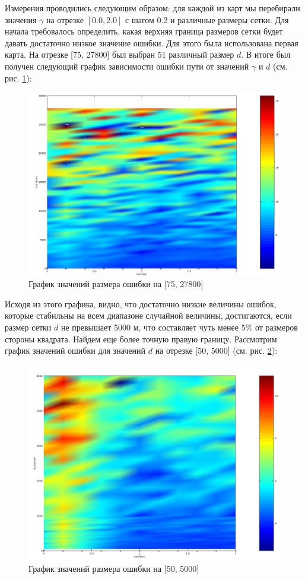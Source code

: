Измерения проводились следующим образом: для каждой из карт мы
перебирали значения $\gamma$ на отрезке $[0.0, 2.0]$ с шагом 0.2 и различные размеры
сетки. Для начала требовалось определить, какая верхняя граница размеров
сетки будет давать достаточно низкое значение ошибки. Для этого была
использована первая карта. На отрезке [75, 27800] был выбран 51 различный
размер $d$. В итоге был получен следующий график зависимости ошибки пути
от значений $\gamma$ и $d$ (см. рис. \ref{pic:error_75_27800}):
\begin{figure}[H]
	\includegraphics[width=\textwidth]{images/3_6.png}
	\caption{График значений размера ошибки на [75, 27800]}
	\label{pic:error_75_27800}
\end{figure}
\vspace{2mm}
Исходя из этого графика, видно, что достаточно низкие величины
ошибок, которые стабильны на всем диапазоне случайной величины,
достигаются, если размер сетки $d$ не превышает 5000 м, что составляет чуть
менее 5\% от размеров стороны квадрата. Найдем еще более точную правую
границу. Рассмотрим график значений ошибки для значений $d$ на отрезке [50, 5000] (см.
рис. \ref{pic:error_50_5000}):
\begin{figure}[H]
	\includegraphics[width=\textwidth]{images/3_7.png}
	\caption{График значений размера ошибки на [50, 5000]}
	\label{pic:error_50_5000}
\end{figure}
